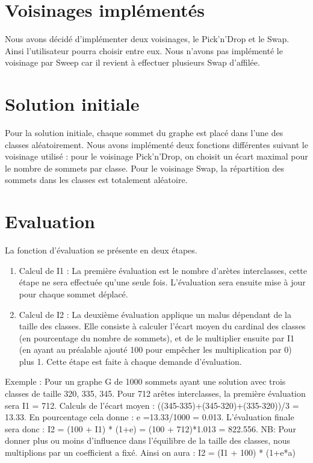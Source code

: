 \documentclass[12pt]{article}
\begin{document}
\section{Voisinages implémentés}
Nous avons décidé d’implémenter deux voisinages, le Pick’n'Drop et le Swap. Ainsi l’utilisateur pourra choisir entre eux.
    Nous n’avons pas implémenté le voisinage par Sweep car il revient à effectuer plusieurs Swap d’affilée.

\section{Solution initiale}

Pour la solution initiale, chaque sommet du graphe est placé dans l’une des classes aléatoirement. Nous avons implémenté deux fonctions différentes suivant le voisinage utilisé : pour le voisinage Pick'n'Drop, on choisit un écart maximal pour le nombre de sommets par classe. Pour le voisinage Swap, la répartition des sommets dans les classes est totalement aléatoire.

\section{Evaluation}

La fonction d’évaluation se présente en deux étapes.

\begin{enumerate}
\item  Calcul de I1 : La première évaluation est le nombre d’arètes interclasses, cette étape ne sera effectuée qu’une seule fois. L’évaluation sera ensuite mise à jour pour chaque sommet déplacé.

\item Calcul de I2 : La deuxième évaluation applique un malus dépendant de la taille des classes. Elle consiste à calculer l’écart moyen du cardinal des classes (en pourcentage du nombre de sommets), et de le multiplier ensuite par I1 (en ayant au préalable ajouté 100 pour empêcher les multiplication par 0) plus 1. Cette étape est faite à chaque demande d’évaluation.
\end{enumerate}

Exemple : Pour un graphe G de 1000 sommets ayant une solution avec trois classes de taille 320, 335, 345.
Pour 712 arêtes interclasses, la première évaluation sera I1 = 712.
Calculs de l’écart moyen : ((345-335)+(345-320)+(335-320))/3 = 13.33.
En pourcentage cela donne : e =13.33/1000 = 0.013.
L’évaluation finale sera donc : I2 = (100 + I1) * (1+e) = (100 + 712)*1.013 = 822.556.
NB: Pour donner plus ou moins d’influence dans l’équilibre de la taille des classes, nous multiplions par un coefficient a fixé. Ainsi on aura : I2 = (I1 + 100) * (1+e*a)
\end{document}
